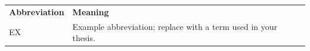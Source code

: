 \begin{tabular}{@{}lp{95mm}@{}}
\textbf{Abbreviation} & \textbf{Meaning}\\[4pt]
EX & Example abbreviation; replace with a term used in your thesis.\\
\end{tabular}
